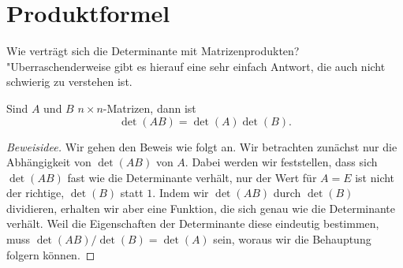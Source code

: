 \section{Produktformel}
Wie verträgt sich die Determinante mit Matrizenprodukten?
"Uberraschenderweise gibt es hierauf eine sehr einfach Antwort,
die auch nicht schwierig zu verstehen ist.

\begin{satz}\label{detprodukt}
Sind $A$ und $B$ $n\times n$-Matrizen, dann ist
\[
\det(AB)=\det(A)\det(B).
\]
\end{satz}

\begin{proof}[Beweisidee]
Wir gehen den Beweis wie folgt an.
Wir betrachten zunächst nur die Abhängigkeit von $\det(AB)$ von $A$.
Dabei werden wir feststellen,
dass sich $\det(AB)$ fast wie die Determinante verhält, nur der
Wert für $A=E$ ist nicht der richtige, $\det(B)$ statt $1$.
Indem wir
$\det(AB)$ durch $\det(B)$ dividieren, erhalten wir aber eine Funktion,
die sich genau wie die Determinante verhält.
Weil die Eigenschaften der Determinante diese eindeutig bestimmen, muss
$\det(AB)/\det(B)=\det(A)$ sein, woraus wir die Behauptung folgern können.
\end{proof}

